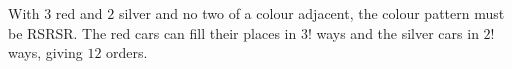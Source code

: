 With $3$ red and $2$ silver and no two of a colour adjacent, the colour pattern must be RSRSR. The red cars can fill their places in $3!$ ways and the silver cars in $2!$ ways, giving $\boxed{12}$ orders.
